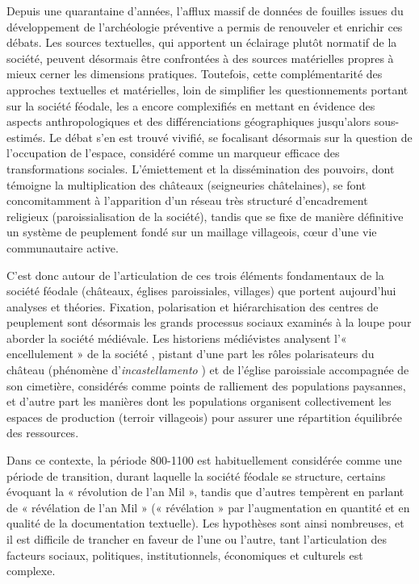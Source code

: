 \documentclass[12pt, a4paper, oneside]{book}
\begin{document}
	Depuis une quarantaine d'années, l'afflux massif de données de fouilles issues du développement de l'archéologie préventive a permis de renouveler et enrichir ces débats.
	Les sources textuelles, qui apportent un éclairage plutôt normatif de la société, peuvent désormais être confrontées à des sources matérielles propres à mieux cerner les dimensions pratiques.
	Toutefois, cette complémentarité des approches textuelles et matérielles, loin de simplifier les questionnements portant sur la société féodale, les a encore complexifiés en mettant en évidence des aspects anthropologiques et des différenciations géographiques jusqu'alors sous-estimés.
	Le débat s'en est trouvé vivifié, se focalisant désormais sur la question de l'occupation de l'espace, considéré comme un marqueur efficace des transformations sociales.
	L'émiettement et la dissémination des pouvoirs, dont témoigne la multiplication des châteaux (seigneuries châtelaines), se font concomitamment à l'apparition d'un réseau très structuré d'encadrement religieux (paroissialisation de la société), tandis que se fixe de manière définitive un système de peuplement fondé sur un maillage villageois, cœur d'une vie communautaire active.
	
	C'est donc autour de l'articulation de ces trois éléments fondamentaux de la société féodale (châteaux, églises paroissiales, villages) que portent aujourd'hui analyses et théories.
	Fixation, polarisation et hiérarchisation des centres de peuplement sont désormais les grands processus sociaux examinés à la loupe pour aborder la société médiévale.
	Les historiens médiévistes analysent l'« encellulement » de la société \autocite{fossier_enfance_1982}, pistant d'une part les rôles polarisateurs du château (phénomène d'\textit{incastellamento} \autocite{toubert_les_1973}) et de l'église paroissiale accompagnée de son cimetière, considérés comme points de ralliement des populations paysannes, et d'autre part les manières dont les populations organisent collectivement les espaces de production (terroir villageois) pour assurer une répartition équilibrée des ressources.
	
	Dans ce contexte, la période 800-1100 est habituellement considérée comme une période de transition, durant laquelle la société féodale se structure, certains évoquant la « révolution de l'an Mil »\autocite{fossier_enfance_1982}, tandis que d'autres tempèrent en parlant de « révélation de l'an Mil » \autocite{barthelemy_societe_1993}(« révélation » par l'augmentation en quantité et en qualité de la documentation textuelle).
	Les hypothèses sont ainsi nombreuses, et il est difficile de trancher en faveur de l'une ou l'autre, tant l'articulation des facteurs sociaux, politiques, institutionnels, économiques et culturels est complexe.
	
\end{document}
